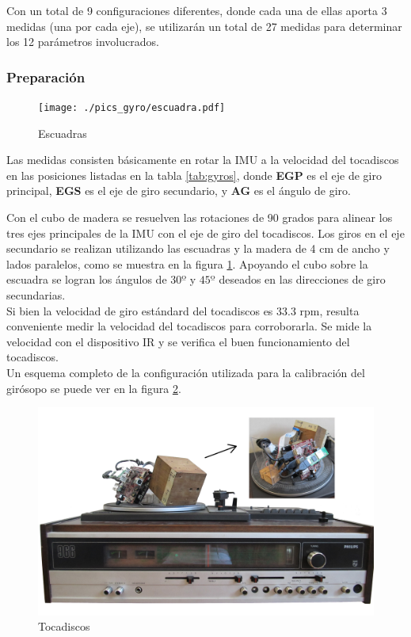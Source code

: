 \documentclass[main]{subfiles}
\begin{document}
Con un total de 9 configuraciones diferentes, donde cada una de ellas aporta 3 medidas (una por cada eje), se utilizarán un total de 27 medidas para determinar los 12 parámetros involucrados.

\vspace{-5pt}
\subsubsection*{Preparación}

\begin{figure}
  \vspace{-30pt}
  \begin{center}
    \texttt{[image: ./pics\_gyro/escuadra.pdf]}
  \end{center}
  \vspace{-20pt}
  \caption{Escuadras}
  \label{fig:escuadras}
\end{figure}

Las medidas consisten básicamente en rotar la IMU a la velocidad del tocadiscos en las posiciones listadas en la tabla \ref{tab:gyros}, donde \textbf{EGP} es el eje de giro principal, \textbf{EGS} es el eje de giro secundario, y \textbf{AG} es el ángulo de giro.

Con el cubo de madera se resuelven las rotaciones de 90 grados para alinear los tres ejes principales de la IMU con el eje de giro del tocadiscos. Los giros en el eje secundario se realizan utilizando las escuadras y la madera de 4 cm de ancho y lados paralelos, como se muestra en la figura \ref{fig:escuadras}. Apoyando el cubo sobre la escuadra se logran los ángulos de $30º$ y $45º$ deseados en las direcciones de giro secundarias.\\

Si bien la velocidad de giro estándard del tocadiscos es 33.3 rpm, resulta conveniente medir la velocidad del tocadiscos para corroborarla. Se mide la velocidad con el dispositivo IR y se verifica el buen funcionamiento del tocadiscos.\\

Un esquema completo de la configuración utilizada para la calibración del girósopo se puede ver en la figura \ref{fig:tocadiscos}.

\begin{figure}[h!]
	\centering
	\includegraphics[width=.9\textwidth]{./pics_gyro/tocadiscos.jpg}
	\caption{Tocadiscos}
	\label{fig:tocadiscos}
\end{figure}
\end{document}
